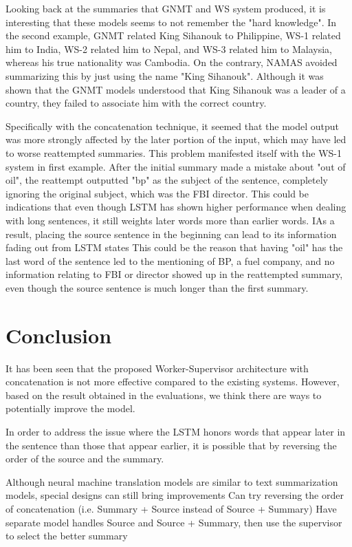 \documentclass[letterpaper]{article} %
\begin{document}
Looking back at the summaries that GNMT and WS system produced, it is interesting that these models seems to not remember the "hard knowledge". In the second example, GNMT related King Sihanouk to Philippine, WS-1 related him to India, WS-2 related him to Nepal, and WS-3 related him to Malaysia, whereas his true nationality was Cambodia. On the contrary, NAMAS avoided summarizing this by just using the name "King Sihanouk". Although it was shown that the GNMT models understood that King Sihanouk was a leader of a country, they failed to associate him with the correct country.

Specifically with the concatenation technique, it seemed that the model output was more strongly affected by the later portion of the input, which may have led to worse reattempted summaries. This problem manifested itself with the WS-1 system in first example. After the initial summary made a mistake about "out of oil", the reattempt outputted "bp" as the subject of the sentence, completely ignoring the original subject, which was the FBI director. This could be indications that even though LSTM has shown higher performance when dealing with long sentences, it still weights later words more than earlier words. IAs a result, placing the source sentence in the beginning can lead to its information fading out from LSTM states This could be the reason that having "oil" has the last word of the sentence led to the mentioning of BP, a fuel company, and no information relating to FBI or director showed up in the reattempted summary, even though the source sentence is much longer than the first summary.

\section{Conclusion}
It has been seen that the proposed Worker-Supervisor architecture with concatenation is not more effective compared to the existing systems. However, based on the result obtained in the evaluations, we think there are ways to potentially improve the model.

In order to address the issue where the LSTM honors words that appear later in the sentence than those that appear earlier, it is possible that by reversing the order of the source and the summary.

Although neural machine translation models are similar to text summarization models, special designs can still bring improvements
Can try reversing the order of concatenation (i.e. Summary + Source instead of Source + Summary)
Have separate model handles Source and Source + Summary, then use the supervisor to select the better summary



\end{document}
